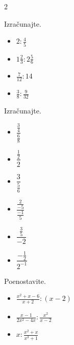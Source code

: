         \begin{multicols}{2}
            
            \begin{naloga}
                Izračunajte.
                \begin{itemize}
                    \item $2:\frac{4}{5}$ 
                    \item $1\frac{2}{3}:2\frac{5}{6}$ 
                    \item $\frac{7}{12}:14$ 
                    \item $\frac{3}{8}:\frac{9}{32}$ 
                \end{itemize}
            \end{naloga}
        


        
            \begin{naloga}
                Izračunajte.
                \begin{itemize}
                            \item $\dfrac{\frac{3}{4}}{\frac{6}{8}}$ 
                            \item $\dfrac{\frac{1}{2}}{2}$ 
                            \item $\dfrac{3}{\frac{5}{6}}$ 
                            \item $\dfrac{\frac{2}{-5}}{\frac{-1}{5}}$ 
                            \item $\dfrac{\frac{3}{5}}{-2}$ 
                            \item $\dfrac{-\frac{1}{2}}{2^{-1}}$ 

                \end{itemize}
            \end{naloga}
        


        
            \begin{naloga}
                Poenostavite.
                \begin{itemize}
                    \item $\frac{x^2+x-6}{x+2}:(x-2)$ 
                    \item $\frac{x-1}{2x^2-4x}:\frac{x^2}{x-2}$ 
                    \item $x:\frac{x^2+x}{x^3+1}$ 
                \end{itemize}
            \end{naloga}
        


\end{multicols}
